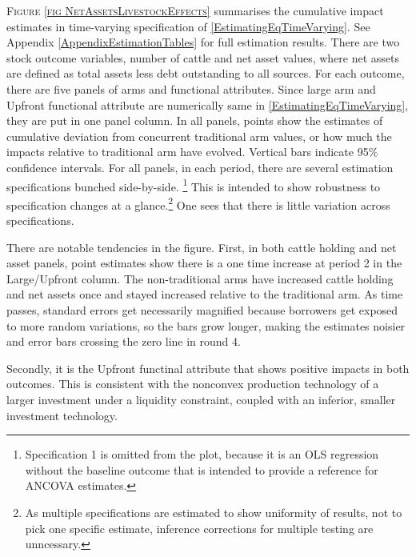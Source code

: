 	\textsc{\footnotesize Figure \ref{fig NetAssetsLivestockEffects}} summarises the cumulative impact estimates in time-varying specification of \eqref{EstimatingEqTimeVarying}.  See Appendix \ref{AppendixEstimationTables} for full estimation results. There are two stock outcome variables,  number of cattle and net asset values, where net assets are defined as total assets less debt outstanding to all sources. For each outcome, there are five panels of arms and functional attributes. Since \textsf{large} arm and \textsf{Upfront} functional attribute are numerically same in \eqref{EstimatingEqTimeVarying}, they are put in one panel column. In all panels, points show the estimates of cumulative deviation from concurrent \textsf{traditional} arm values, or how much the impacts relative to \textsf{traditional} arm have evolved. Vertical bars indicate 95\% confidence intervals. 
	For all panels, in each period, there are several estimation specifications bunched side-by-side. \footnote{Specification 1 is omitted from the plot, because it is an OLS regression without the baseline outcome that is intended to provide a reference for ANCOVA estimates. } This is intended to show robustness to specification changes at a glance.\footnote{As multiple specifications are estimated to show uniformity of results, not to pick one specific estimate, inference corrections for multiple testing are unncessary. } One sees that there is little variation across specifications. %
	
	There are notable tendencies in the figure. First, in both cattle holding and net asset panels, point estimates show there is a one time increase at period 2 in the \textsf{Large/Upfront} column. %
	The non-\textsf{traditional} arms have increased cattle holding and net assets once and stayed increased relative to the \textsf{traditional} arm. As time passes, standard errors get necessarily magnified because borrowers get exposed to more random variations, so the bars grow longer, making the estimates noisier and error bars crossing the zero line in round 4. %

	Secondly, it is the \textsf{Upfront} functinal attribute that shows positive impacts in both outcomes. %
	This is consistent with the nonconvex production technology of a larger investment under a liquidity constraint, coupled with an inferior, smaller investment technology.

